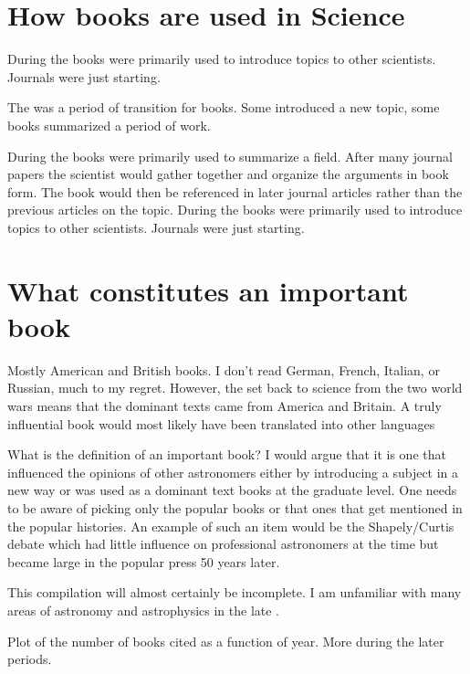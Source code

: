 \section{How books are used in Science}
During the  books were primarily used to introduce topics to
other scientists.  Journals were just starting.

The  was a period of transition for books. Some introduced
a new topic, some books summarized a period of work.

During the  books were primarily used to summarize a field.
After many journal papers the scientist would gather together and
organize the arguments in book form.  The book would then be referenced
in later journal articles rather than the previous articles on the topic.
During the  books were primarily used to introduce topics to
other scientists.  Journals were just starting.

\section{What constitutes an important book}

Mostly American and British books. I don't read German, French, Italian, or Russian,
much to my regret.  However, the set back to science from the two world wars means that
the dominant texts came from America and Britain. A truly influential book would most likely
have been translated into other languages

What is the definition of an important book? I would argue that it is one that
influenced the opinions of other astronomers either by introducing a subject in a
new way or was used as a dominant text books at the graduate level.  One needs to
be aware of picking only the popular books or that ones that get mentioned in the
popular histories.  An example of such an item would be the Shapely/Curtis debate
which had little influence on professional astronomers at the time but became large
in the popular press 50 years later.

This compilation will almost certainly be incomplete.  I am unfamiliar with many
areas of astronomy and astrophysics in the late .

Plot of the number of books cited as a function of year.  More during the later periods.

